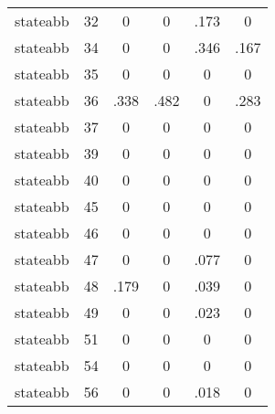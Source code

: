 \begin{table}[htbp]
\begin{tabular}{l*{5}{c}}
stateabb    &          32&           0&           0&        .173&           0\\
stateabb    &          34&           0&           0&        .346&        .167\\
stateabb    &          35&           0&           0&           0&           0\\
stateabb    &          36&        .338&        .482&           0&        .283\\
stateabb    &          37&           0&           0&           0&           0\\
stateabb    &          39&           0&           0&           0&           0\\
stateabb    &          40&           0&           0&           0&           0\\
stateabb    &          45&           0&           0&           0&           0\\
stateabb    &          46&           0&           0&           0&           0\\
stateabb    &          47&           0&           0&        .077&           0\\
stateabb    &          48&        .179&           0&        .039&           0\\
stateabb    &          49&           0&           0&        .023&           0\\
stateabb    &          51&           0&           0&           0&           0\\
stateabb    &          54&           0&           0&           0&           0\\
stateabb    &          56&           0&           0&        .018&           0\\
\bottomrule
\end{tabular}
\end{table}
